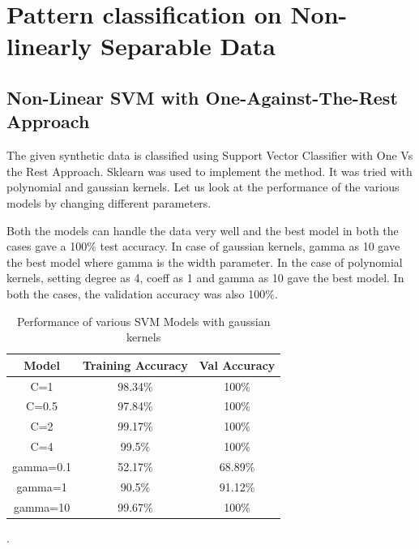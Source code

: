 \section{Pattern classification on Non-linearly Separable Data}
\subsection{Non-Linear SVM with One-Against-The-Rest Approach}


The given synthetic data is classified using Support Vector Classifier with One Vs the Rest Approach. Sklearn was used to implement the method. It was tried with polynomial and gaussian kernels. Let us look at the performance of the various models by changing different parameters. 

Both the models can handle the data very well and the best model in both the cases gave a 100$\%$  test accuracy. In case of gaussian kernels, gamma as 10 gave the best model where gamma is the width parameter. In the case of polynomial kernels, setting degree as 4, coeff as 1 and gamma as 10 gave the best model.  In both the cases, the validation accuracy was also 100$\%$.


{
\begin{table}[!h]
\centering
\begin{tabular}{ |c|c|c|  }
\hline
\rowcolor{lightgray} Model & Training Accuracy & Val Accuracy\\
\hline
C=1 & 98.34$\%$  & 100$\%$  \\ 
\hline
C=0.5 & 97.84$\%$  & 100$\%$  \\ 
\hline
C=2 & 99.17$\%$  & 100$\%$  \\ 
\hline
C=4 & 99.5$\%$  & 100$\%$  \\ 
\hline
gamma=0.1 & 52.17$\%$  & 68.89$\%$  \\ 
\hline
gamma=1 & 90.5$\%$  & 91.12$\%$  \\ 
\hline
gamma=10 & 99.67$\%$  & 100$\%$  \\ 
\hline
\end{tabular}
\caption{Performance of various SVM Models with gaussian kernels}.
\label{table:1}
\end{table}
}

